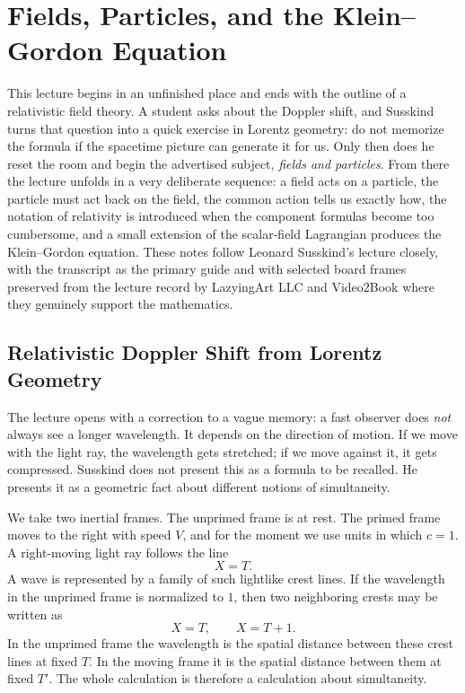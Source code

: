 \chapter{Fields, Particles, and the Klein--Gordon Equation}

This lecture begins in an unfinished place and ends with the outline of a relativistic field theory. A student asks about the Doppler shift, and Susskind turns that question into a quick exercise in Lorentz geometry: do not memorize the formula if the spacetime picture can generate it for us. Only then does he reset the room and begin the advertised subject, \emph{fields and particles}. From there the lecture unfolds in a very deliberate sequence: a field acts on a particle, the particle must act back on the field, the common action tells us exactly how, the notation of relativity is introduced when the component formulas become too cumbersome, and a small extension of the scalar-field Lagrangian produces the Klein--Gordon equation. These notes follow Leonard Susskind's lecture closely, with the transcript as the primary guide and with selected board frames preserved from the lecture record by LazyingArt LLC and Video2Book where they genuinely support the mathematics.

\section{Relativistic Doppler Shift from Lorentz Geometry}

The lecture opens with a correction to a vague memory: a fast observer does \emph{not} always see a longer wavelength. It depends on the direction of motion. If we move with the light ray, the wavelength gets stretched; if we move against it, it gets compressed. Susskind does not present this as a formula to be recalled. He presents it as a geometric fact about different notions of simultaneity.

We take two inertial frames. The unprimed frame is at rest. The primed frame moves to the right with speed \(V\), and for the moment we use units in which \(c=1\). A right-moving light ray follows the line
\begin{equation}
X=T.
\end{equation}
A wave is represented by a family of such lightlike crest lines. If the wavelength in the unprimed frame is normalized to \(1\), then two neighboring crests may be written as
\begin{equation}
X=T,
\qquad
X=T+1.
\end{equation}
In the unprimed frame the wavelength is the spatial distance between these crest lines at fixed \(T\). In the moving frame it is the spatial distance between them at fixed \(T'\). The whole calculation is therefore a calculation about simultaneity.

